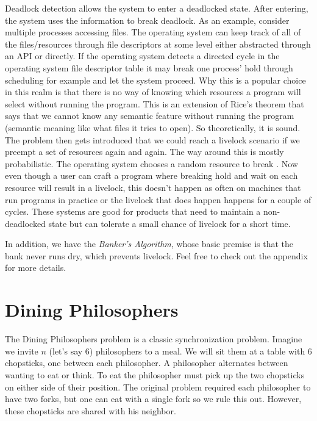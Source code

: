 Deadlock detection allows the system to enter a deadlocked state.
After entering, the system uses the information to break deadlock.
As an example, consider multiple processes accessing files.
The operating system can keep track of all of the files/resources through file descriptors at some level either abstracted through an API or directly.
If the operating system detects a directed cycle in the operating system file descriptor table it may break one process' hold through scheduling for example and let the system proceed.
Why this is a popular choice in this realm is that there is no way of knowing which resources a program will select without running the program.
This is an extension of Rice's theorem \cite{rice} that says that we cannot know any semantic feature without running the program (semantic meaning like what files it tries to open).
So theoretically, it is sound.
The problem then gets introduced that we could reach a livelock scenario if we preempt a set of resources again and again.
The way around this is mostly probabilistic.
The operating system chooses a random resource to break .
Now even though a user can craft a program where breaking hold and wait on each resource will result in a livelock, this doesn't happen as often on machines that run programs in practice or the livelock that does happen happens for a couple of cycles.
These systems are good for products that need to maintain a non-deadlocked state but can tolerate a small chance of livelock for a short time.

In addition, we have the \textit{Banker's Algorithm}, whose basic premise is that the bank never runs dry, which prevents livelock. Feel free to check out the appendix for more details.

\section{Dining Philosophers}

The Dining Philosophers problem is a classic synchronization problem.
Imagine we invite $n$ (let's say 6) philosophers to a meal.
We will sit them at a table with 6 chopsticks, one between each philosopher.
A philosopher alternates between wanting to eat or think.
To eat the philosopher must pick up the two chopsticks on either side of their position.
The original problem required each philosopher to have two forks, but one can eat with a single fork so we rule this out.
However, these chopsticks are shared with his neighbor.

